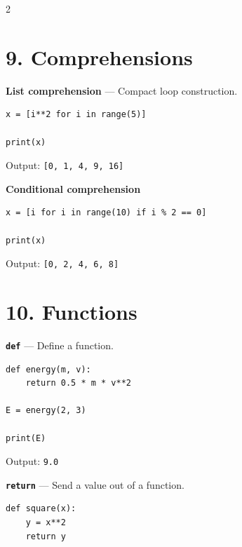 \documentclass[10pt,a4paper]{article}
\begin{document}
\begin{multicols}{2}
\section*{9. Comprehensions}

\begin{card}
\textbf{List comprehension} --- Compact loop construction.

\begin{lstlisting}[style=pythonstyle]
x = [i**2 for i in range(5)]

print(x)
\end{lstlisting}

Output:
\texttt{[0, 1, 4, 9, 16]}
\end{card}

\begin{card}
\textbf{Conditional comprehension}

\begin{lstlisting}[style=pythonstyle]
x = [i for i in range(10) if i % 2 == 0]

print(x)
\end{lstlisting}

Output:
\texttt{[0, 2, 4, 6, 8]}
\end{card}

\section*{10. Functions}

\begin{card}
\textbf{\texttt{def}} --- Define a function.

\begin{lstlisting}[style=pythonstyle]
def energy(m, v):
    return 0.5 * m * v**2

E = energy(2, 3)

print(E)
\end{lstlisting}

Output: \texttt{9.0}
\end{card}

\begin{card}
\textbf{\texttt{return}} --- Send a value out of a function.

\begin{lstlisting}[style=pythonstyle]
def square(x):
    y = x**2
    return y


\end{lstlisting}
\end{card}
\end{multicols}
\end{document}
